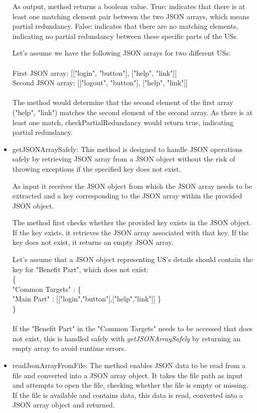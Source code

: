\begin{itemize}
	As output, method returns a boolean value. True: indicates that there is at least one matching element pair between the two JSON arrays, which means partial redundancy. False: indicates that there are no matching elements, indicating no partial redundancy between these specific parts of the USs.
	
	\begin{example} Let's assume we have the following JSON arrays for two different USs: \\\\
		First JSON array: [["login", "button"], ["help", "link"]]\\
		Second JSON array:	[["logout", "button"], ["help", "link"]]\\\\
		The method would determine that the second element of the first array ("help", "link") matches the second element of the second array. As there is at least one match, checkPartialRedundancy would return true, indicating partial redundancy.
	\end{example}
	
	
	\item getJSONArraySafely: This method is designed to handle JSON operations safely by retrieving JSON array from a JSON object without the risk of throwing exceptions if the specified key does not exist.
	
	As input it receives the JSON object from which the JSON array needs to be extracted and a key corresponding to the JSON array within the provided JSON object.
	
	The method first checks whether the provided key exists in the JSON object. If the key exists, it retrieves the JSON array associated with that key. If the key does not exist, it returns an empty JSON array.
	\begin{example} Let's assume that a JSON object representing US's details should contain the key for "Benefit Part", which does not exist:\\
		\{\\
		"Common Targets" : \{\\
		"Main Part" : [["login","button"],["help","link"]]
		\}\\
		\} \\\\
		If the "Benefit Part" in the "Common Targets" needs to be accessed that does not exist, this is handled safely with \textit{getJSONArraySafely} by returning an empty array to avoid runtime errors.
	\end{example}
	
	\item readJsonArrayFromFile: The method enables JSON data to be read from a file and converted into a JSON array object. It takes the file path as input and attempts to open the file, checking whether the file is empty or missing. If the file is available and contains data, this data is read, converted into a JSON array object and returned.
	
\end{itemize}

